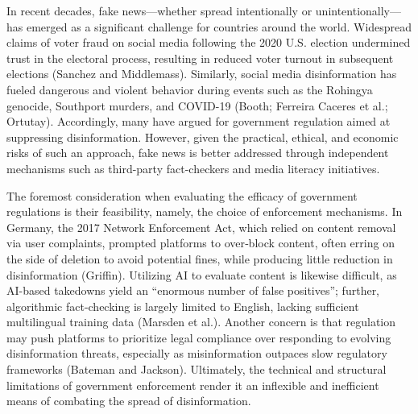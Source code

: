 
In recent decades, fake news—whether spread intentionally or unintentionally—has emerged as a significant challenge for countries around the world. Widespread claims of voter fraud on social media following the 2020 U.S. election undermined trust in the electoral process, resulting in reduced voter turnout in subsequent elections (Sanchez and Middlemass). Similarly, social media disinformation has fueled dangerous and violent behavior during events such as the Rohingya genocide, Southport murders, and COVID-19 (Booth; Ferreira Caceres et al.; Ortutay). Accordingly, many have argued for government regulation aimed at suppressing disinformation. However, given the practical, ethical, and economic risks of such an approach, fake news is better addressed through independent mechanisms such as third-party fact-checkers and media literacy initiatives. 

The foremost consideration when evaluating the efficacy of government regulations is their feasibility, namely, the choice of enforcement mechanisms. In Germany, the 2017 Network Enforcement Act, which relied on content removal via user complaints, prompted platforms to over‐block content, often erring on the side of deletion to avoid potential fines, while producing little reduction in disinformation (Griffin). Utilizing AI to evaluate content is likewise difficult, as AI-based takedowns yield an “enormous number of false positives”; further, algorithmic fact-checking is largely limited to English, lacking sufficient multilingual training data (Marsden et al.). Another concern is that regulation may push platforms to prioritize legal compliance over responding to evolving disinformation threats, especially as misinformation outpaces slow regulatory frameworks (Bateman and Jackson). Ultimately, the technical and structural limitations of government enforcement render it an inflexible and inefficient means of combating the spread of disinformation. 

